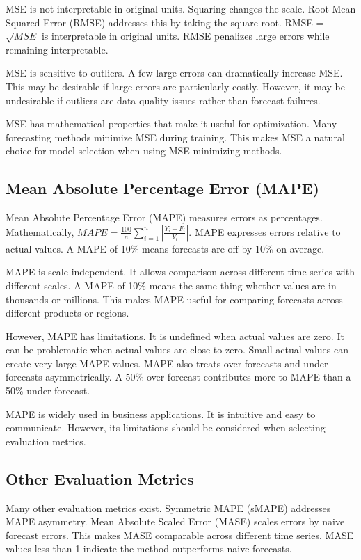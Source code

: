 MSE is not interpretable in original units. Squaring changes the scale. Root Mean Squared Error (RMSE) addresses this by taking the square root. RMSE = \(\sqrt{MSE}\) is interpretable in original units. RMSE penalizes large errors while remaining interpretable.

MSE is sensitive to outliers. A few large errors can dramatically increase MSE. This may be desirable if large errors are particularly costly. However, it may be undesirable if outliers are data quality issues rather than forecast failures.

MSE has mathematical properties that make it useful for optimization. Many forecasting methods minimize MSE during training. This makes MSE a natural choice for model selection when using MSE-minimizing methods.

\subsection{Mean Absolute Percentage Error (MAPE)}

Mean Absolute Percentage Error (MAPE) measures errors as percentages. Mathematically, \(MAPE = \frac{100}{n}\sum_{i=1}^{n}\left|\frac{Y_i - F_i}{Y_i}\right|\). MAPE expresses errors relative to actual values. A MAPE of 10\% means forecasts are off by 10\% on average.

MAPE is scale-independent. It allows comparison across different time series with different scales. A MAPE of 10\% means the same thing whether values are in thousands or millions. This makes MAPE useful for comparing forecasts across different products or regions.

However, MAPE has limitations. It is undefined when actual values are zero. It can be problematic when actual values are close to zero. Small actual values can create very large MAPE values. MAPE also treats over-forecasts and under-forecasts asymmetrically. A 50\% over-forecast contributes more to MAPE than a 50\% under-forecast.

MAPE is widely used in business applications. It is intuitive and easy to communicate. However, its limitations should be considered when selecting evaluation metrics.

\subsection{Other Evaluation Metrics}

Many other evaluation metrics exist. Symmetric MAPE (sMAPE) addresses MAPE asymmetry. Mean Absolute Scaled Error (MASE) scales errors by naive forecast errors. This makes MASE comparable across different time series. MASE values less than 1 indicate the method outperforms naive forecasts.

